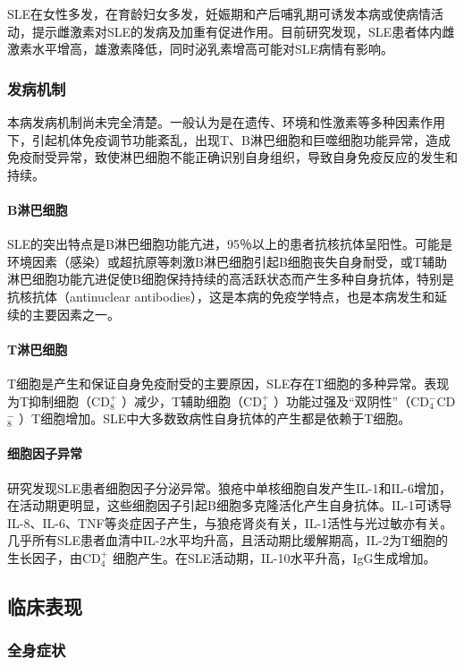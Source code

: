 SLE在女性多发，在育龄妇女多发，妊娠期和产后哺乳期可诱发本病或使病情活动，提示雌激素对SLE的发病及加重有促进作用。目前研究发现，SLE患者体内雌激素水平增高，雄激素降低，同时泌乳素增高可能对SLE病情有影响。

\subsubsection{发病机制}

本病发病机制尚未完全清楚。一般认为是在遗传、环境和性激素等多种因素作用下，引起机体免疫调节功能紊乱，出现T、B淋巴细胞和巨噬细胞功能异常，造成免疫耐受异常，致使淋巴细胞不能正确识别自身组织，导致自身免疫反应的发生和持续。
\paragraph{B淋巴细胞}

SLE的突出特点是B淋巴细胞功能亢进，95％以上的患者抗核抗体呈阳性。可能是环境因素（感染）或超抗原等刺激B淋巴细胞引起B细胞丧失自身耐受，或T辅助淋巴细胞功能亢进促使B细胞保持持续的高活跃状态而产生多种自身抗体，特别是抗核抗体（antinuclear
antibodies），这是本病的免疫学特点，也是本病发生和延续的主要因素之一。
\paragraph{T淋巴细胞}

T细胞是产生和保证自身免疫耐受的主要原因，SLE存在T细胞的多种异常。表现为T抑制细胞（CD$_8^+$
）减少，T辅助细胞（CD$_4^+$
）功能过强及“双阴性”（CD$_4^-$CD$_8^-$
）T细胞增加。SLE中大多数致病性自身抗体的产生都是依赖于T细胞。
\paragraph{细胞因子异常}

研究发现SLE患者细胞因子分泌异常。狼疮中单核细胞自发产生IL-1和IL-6增加，在活动期更明显，这些细胞因子引起B细胞多克隆活化产生自身抗体。IL-1可诱导IL-8、IL-6、TNF等炎症因子产生，与狼疮肾炎有关，IL-1活性与光过敏亦有关。几乎所有SLE患者血清中IL-2水平均升高，且活动期比缓解期高，IL-2为T细胞的生长因子，由CD$_4^+$
细胞产生。在SLE活动期，IL-10水平升高，IgG生成增加。

\subsection{临床表现}

\subsubsection{全身症状}

